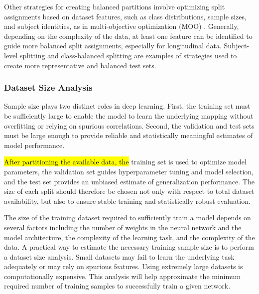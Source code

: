 Other strategies for creating balanced partitions involve optimizing split assignments based on dataset features, such as class distributions, sample sizes, and subject identities, as in multi-objective optimization (MOO) \cite{Igwe2026}. Generally, depending on the complexity of the data, at least one feature can be identified to guide more balanced split assignments, especially for longitudinal data. Subject-level splitting \cite{Rumala2023} and class-balanced splitting \cite{Xu2018, Khan2022} are examples of strategies used to create more representative and balanced test sets.

\subsubsection{Dataset Size Analysis}
\label{sec:dataModel:subsec:data requirements:subsubsec:dataset size analysis}
Sample size plays two distinct roles in deep learning. First, the training set must be sufficiently large to enable the model to learn the underlying mapping without overfitting or relying on spurious correlations. Second, the validation and test sets must be large enough to provide reliable and statistically meaningful estimates of model performance.

\hl{After partitioning the available data, the} training set is used to optimize model parameters, the validation set guides hyperparameter tuning and model selection, and the test set provides an unbiased estimate of generalization performance. The size of each split should therefore be chosen not only with respect to total dataset availability, but also to ensure stable training and statistically robust evaluation.

The size of the training dataset required to sufficiently train a \DL model depends on several factors including the number of weights in the neural network and the model architecture, the complexity of the learning task, and the complexity of the data. A practical way to estimate the necessary training sample size is to perform a dataset size analysis. Small datasets may fail to learn the underlying task adequately or may rely on spurious features. Using extremely large datasets is computationally expensive. This analysis will help approximate the minimum required number of training samples to successfully train a given network. 

